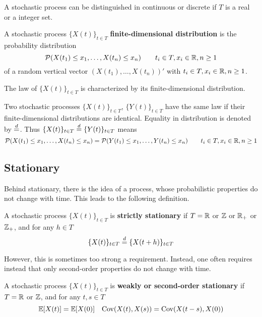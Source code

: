 A stochastic process can be distinguished in continuous or discrete if $T$ is a real or a integer set.

\begin{definition}
	A stochastic process $\{X(t)\}_{t \in T}$ \textbf{finite-dimensional distribution} is the probability distribution
	\begin{equation}
		\mathcal{P}(X(t_1) \le x_1, \dots, X(t_n) \le x_n) \qquad t_i \in T, x_i \in \mathbb{R}, n \ge 1
	\end{equation} 
	of a random vertical vector $(X(t_1), \dots, X(t_n))'$ with $t_i \in T, x_i \in \mathbb{R}, n \ge 1$. 
\end{definition}

The law of $\{X(t)\}_{t \in T}$ is characterized by its finite-dimensional distribution.

Two stochastic processes $\{X(t)\}_{t \in T}$, $\{Y(t)\}_{t \in T}$ have the same law if their finite-dimensional distributions are identical. Equality in distribution is denoted by $\overset{d}{=}$. Thus $\{X(t)\}_{t \in T} \overset{d}{=} \{Y(t)\}_{t \in T}$ means
\begin{equation}
	\mathcal{P}(X(t_1) \le x_1, \dots, X(t_n) \le x_n) = \mathcal{P}(Y(t_1) \le x_1, \dots, Y(t_n) \le x_n) \qquad t_i \in T, x_i \in \mathbb{R}, n \ge 1
\end{equation} 

\subsection{Stationary}
Behind stationary, there is the idea of a process, whose probabilistic properties do not change with time. This leads to the following definition.
\begin{definition}\label{def:strictstationary} 
	A stochastic process $\{X (t)\}_{t \in T}$ is \textbf{strictly stationary} if $T = \mathbb{R}$ or $\mathbb{Z}$ or $\mathbb{R}_+$ or $\mathbb{Z}_+$, and for any $h \in T$
	\begin{equation}
		\{X(t)\}_{t \in T} \overset{d}{=} \{X(t + h)\}_{t \in T} 
	\end{equation}
\end{definition}

However, this is sometimes too strong a requirement. Instead, one often requires instead that only second-order properties do not change with time.
\begin{definition}
	A stochastic process $\{X (t)\}_{t \in T}$ is \textbf{weakly or second-order stationary} if $T = \mathbb{R}$ or $\mathbb{Z}$, and for any $t, s \in T$
	\begin{equation}
		\mathbb{E}[X(t)] = \mathbb{E}[X(0)] \quad \textnormal{Cov}(X(t), X(s)) = \textnormal{Cov}(X(t-s), X(0))
	\end{equation}
\end{definition}

